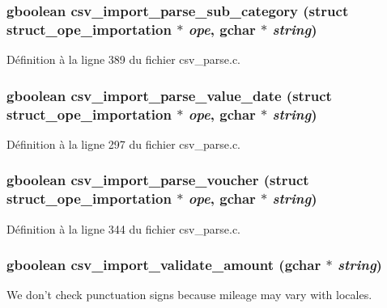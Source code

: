 \subsubsection[{csv\_\-import\_\-parse\_\-sub\_\-category}]{\setlength{\rightskip}{0pt plus 5cm}gboolean csv\_\-import\_\-parse\_\-sub\_\-category (struct {\bf struct\_\-ope\_\-importation} $\ast$ {\em ope}, \/  gchar $\ast$ {\em string})}\label{csv__parse_8c_a8c4113199a2089804857a46a6a117773}


Définition à la ligne 389 du fichier csv\_\-parse.c.

\subsubsection[{csv\_\-import\_\-parse\_\-value\_\-date}]{\setlength{\rightskip}{0pt plus 5cm}gboolean csv\_\-import\_\-parse\_\-value\_\-date (struct {\bf struct\_\-ope\_\-importation} $\ast$ {\em ope}, \/  gchar $\ast$ {\em string})}\label{csv__parse_8c_ab274b2fc3c8e2c33faae4489886ac9f5}


Définition à la ligne 297 du fichier csv\_\-parse.c.

\subsubsection[{csv\_\-import\_\-parse\_\-voucher}]{\setlength{\rightskip}{0pt plus 5cm}gboolean csv\_\-import\_\-parse\_\-voucher (struct {\bf struct\_\-ope\_\-importation} $\ast$ {\em ope}, \/  gchar $\ast$ {\em string})}\label{csv__parse_8c_a56e0a4574248f09bd6b73bc9c77793c8}


Définition à la ligne 344 du fichier csv\_\-parse.c.

\subsubsection[{csv\_\-import\_\-validate\_\-amount}]{\setlength{\rightskip}{0pt plus 5cm}gboolean csv\_\-import\_\-validate\_\-amount (gchar $\ast$ {\em string})}\label{csv__parse_8c_aee14878b526b7273e21e9be83df12a6f}
We don't check punctuation signs because mileage may vary with locales. 

